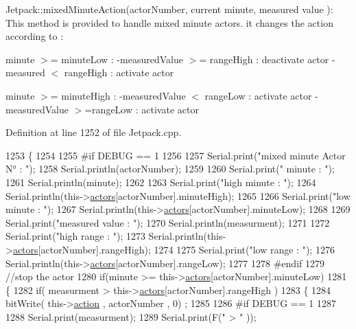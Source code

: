 Jetpack\+::mixed\+Minute\+Action(actor\+Number, current minute, measured value )\+: This method is provided to handle mixed minute actors. it changes the action according to \+:

minute $>$= minute\+Low \+: -\/measured\+Value $>$= range\+High \+: deactivate actor -\/measured $<$ range\+High \+: activate actor

minute $>$= minute\+High \+: -\/measured\+Value $<$ range\+Low \+: activate actor -\/measured\+Value $>$=range\+Low \+: activate actor 

Definition at line 1252 of file Jetpack.\+cpp.


\begin{DoxyCode}
1253 \{
1254 
1255 \textcolor{preprocessor}{#if DEBUG == 1}
1256     
1257     Serial.print(\textcolor{stringliteral}{"mixed minute Actor N° : "});
1258     Serial.println(actorNumber);
1259 
1260     Serial.print(\textcolor{stringliteral}{" minute : "});
1261     Serial.println(minute);
1262 
1263     Serial.print(\textcolor{stringliteral}{"high minute : "});
1264     Serial.println(this->\hyperlink{class_jetpack_a7e16d2f97837f9712a2e6de1c50d99db}{actors}[actorNumber].minuteHigh);
1265 
1266     Serial.print(\textcolor{stringliteral}{"low minute : "});
1267     Serial.println(this->\hyperlink{class_jetpack_a7e16d2f97837f9712a2e6de1c50d99db}{actors}[actorNumber].minuteLow);
1268 
1269     Serial.print(\textcolor{stringliteral}{"measured value : "});
1270     Serial.println(measurment);
1271 
1272     Serial.print(\textcolor{stringliteral}{"high range : "});
1273     Serial.println(this->\hyperlink{class_jetpack_a7e16d2f97837f9712a2e6de1c50d99db}{actors}[actorNumber].rangeHigh);
1274 
1275     Serial.print(\textcolor{stringliteral}{"low range : "});
1276     Serial.println(this->\hyperlink{class_jetpack_a7e16d2f97837f9712a2e6de1c50d99db}{actors}[actorNumber].rangeLow);
1277 
1278 \textcolor{preprocessor}{#endif}
1279     \textcolor{comment}{//stop the actor    }
1280     \textcolor{keywordflow}{if}(minute >= this->\hyperlink{class_jetpack_a7e16d2f97837f9712a2e6de1c50d99db}{actors}[actorNumber].minuteLow)
1281     \{
1282             \textcolor{keywordflow}{if}( measurment > this->\hyperlink{class_jetpack_a7e16d2f97837f9712a2e6de1c50d99db}{actors}[actorNumber].rangeHigh )
1283             \{
1284                 bitWrite( this->\hyperlink{class_jetpack_aca3142925a7b0834b34ae91d26af7765}{action} , actorNumber , 0) ;
1285 
1286 \textcolor{preprocessor}{            #if DEBUG == 1 }
1287 
1288                 Serial.print(measurment);
1289                 Serial.print(F(\textcolor{stringliteral}{" > "} ));

\end{DoxyCode}
